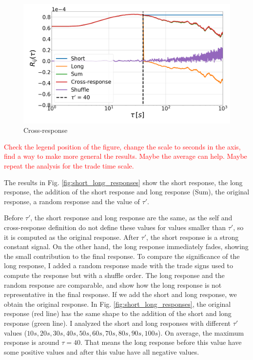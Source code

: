 \begin{figure}
    \centering
    \includegraphics[width=\columnwidth]
    {figures/05_cross_short_long_AAPL_MSFT.png}
    \caption{Cross-response}
    \label{fig:short_long_cross-response}
\end{figure}

\textcolor{red}{Check the legend position of the figure, change the scale to
                seconds in the axis, find a way to make more general the
                results. Maybe the average can help. Maybe repeat the analysis
                for the trade time scale.}

The results in Fig. \ref{fig:short_long_responses} show the short response, the
long response, the addition of the short response and long response (Sum), the
original response, a random response and the value of $\tau'$.

Before $\tau'$, the short response and long response are the same, as the self
and cross-response definition do not define these values for values smaller
than $\tau '$, so it is computed as the original response. After $\tau'$, the
short response is a strong constant signal. On the other hand, the long
response immediately fades, showing the small contribution to the final
response. To compare the significance of the long response, I added a random
response made with the trade signs used to compute the response but with a
shuffle order. The long response and the random response are comparable, and
show how the long response is not representative in the final response.
If we add the short and long response, we obtain the original response. In Fig.
\ref{fig:short_long_responses}, the original response (red line) has the same
shape to the addition of the short and long response (green line). I analyzed
the short and long responses with different $\tau '$ values
($10s, 20s, 30s, 40s, 50s, 60s, 70s, 80s, 90s, 100s$). On average, the maximum
response is around $\tau = 40$. That means the long response before this value
have some positive values and after this value have all negative values.